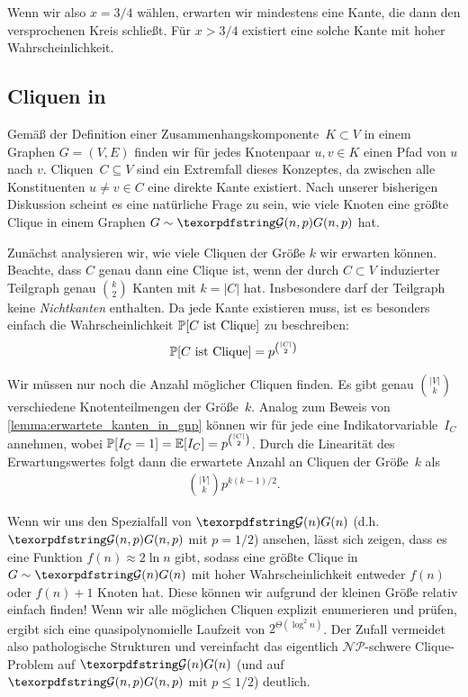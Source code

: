 Wenn wir also $x = 3/4$ wählen, erwarten wir mindestens eine Kante, die dann den versprochenen Kreis schließt.
Für $x > 3/4$ existiert eine solche Kante mit hoher Wahrscheinlichkeit.

\subsection{Cliquen in \Gnp}
Gemäß der Definition einer Zusammenhangskomponente~$K \subset V$ in einem Graphen $G=(V,E)$ finden wir für jedes Knotenpaar $u, v \in K$ einen Pfad von $u$ nach $v$.
Cliquen~$C \subseteq V$ sind ein Extremfall dieses Konzeptes, da zwischen alle Konstituenten $u \ne v \in C$ eine direkte Kante existiert.
Nach unserer bisherigen Diskussion scheint es eine natürliche Frage zu sein, wie viele Knoten eine größte Clique in einem Graphen $G \sim \Gnp$ hat.

Zunächst analysieren wir, wie viele Cliquen der Größe $k$ wir erwarten können.
Beachte, dass $C$ genau dann eine Clique ist, wenn der durch $C \subset V$ induzierter Teilgraph genau $\binom{k}{2}$ Kanten mit $k = |C|$ hat.
Insbesondere darf der Teilgraph keine \emph{Nichtkanten} enthalten.
Da jede Kante existieren muss, ist es besonders einfach die Wahrscheinlichkeit $\mathbb{P}\!\left[\text{$C$ ist Clique}\right]$ zu beschreiben:
\begin{align}
    \mathbb{P}\!\left[\text{$C$ ist Clique}\right] = p^{\binom{|C|}{2}}
\end{align}

Wir müssen nur noch die Anzahl möglicher Cliquen finden.
Es gibt genau $\binom{|V|}{k}$ verschiedene Knotenteilmengen der Größe~$k$.
Analog zum Beweis von \cref{lemma:erwartete_kanten_in_gnp} können wir für jede eine Indikatorvariable~$I_C$ annehmen, wobei $\mathbb{P}\!\left[I_C = 1\right] = \mathbb{E}\!\left[I_C\right] = p^{\binom{|C|}{2}}$.
Durch die Linearität des Erwartungswertes folgt dann die erwartete Anzahl an Cliquen der Größe~$k$ als
\begin{align}
    \binom{|V|}{k} p^{k(k-1)/2}.
\end{align}

Wenn wir uns den Spezialfall von $\Gn$ (d.h. $\Gnp$ mit $p = 1/2$) ansehen, lässt sich zeigen, dass es eine Funktion $f(n) \approx 2\ln n$ gibt,
sodass eine größte Clique in $G \sim \Gn$ mit hoher Wahrscheinlichkeit entweder $f(n)$ oder $f(n)+1$ Knoten hat.
Diese können wir aufgrund der kleinen Größe relativ einfach finden!
Wenn wir alle möglichen Cliquen explizit enumerieren und prüfen, ergibt sich  eine quasipolynomielle Laufzeit von $2^{\Theta(\log^2 n)}$.
Der Zufall vermeidet also pathologische Strukturen und vereinfacht das eigentlich $\mathcal{NP}$-schwere Clique-Problem auf $\Gn$ (und auf $\Gnp$ mit $p \le 1/2$) deutlich.
